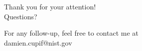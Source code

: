 \documentclass[aspectratio=169]{beamer}
\begin{document}
  
  \begin{frame}[standout]
    \begin{huge}
      Thank you for your attention!\\\alert{Questions?\\}
    \end{huge}
    \vspace{2.5em}
    \begin{scriptsize}
      For any follow-up, feel free to contact me at\\
      damien.cupif@nist.gov
    \end{scriptsize}
  \end{frame}

  
\end{document}
